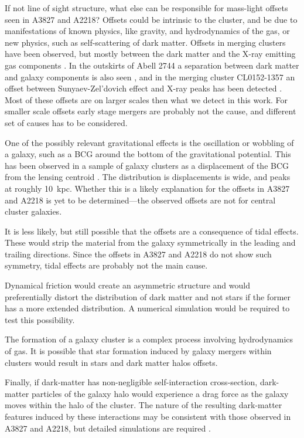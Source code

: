 \documentclass[
  11pt,
  twoside,
  openright,
  titlepage,
  headings=optiontoheadandtoc
]{scrbook}
\begin{document}
If not line of sight structure, what else can be responsible for mass-light offsets seen in 
A3827 and A2218?  Offsets could be intrinsic to the cluster, and be due to manifestations 
of known physics, like gravity, and hydrodynamics of the gas, or new physics, such as self-scattering 
of dark matter. Offsets in merging clusters have been observed, but mostly between the dark matter and 
the X-ray emitting gas components \citep{2006ApJ...648L.109C,2013MNRAS.429..833H,2012ApJ...758..128C}. 
In the outskirts of Abell 2744 a separation between dark matter and galaxy components is also seen
\citep{2011MNRAS.417..333M}, and in the merging cluster CL0152-1357 an offset between Sunyaev-Zel'dovich 
effect and X-ray peaks has been detected \citep{2012ApJ...748...45M}.  Most of these offsets are
on larger scales then what we detect in this work. For smaller scale offsets early stage mergers are
probably not the cause, and different set of causes has to be considered.

One of the possibly relevant gravitational effects is the oscillation or wobbling of a galaxy, 
such as a BCG around the bottom of the gravitational potential. This has been observed in 
a sample of galaxy clusters as a displacement of the BCG from the lensing centroid
\citep{2012MNRAS.426.2944Z}. The distribution is displacements is wide, and peaks at
roughly 10~kpc.  Whether this is a likely explanation for the offsets in A3827 and A2218 is yet 
to be determined---the observed offsets are not for central cluster galaxies.

It is less likely, but still possible that the offsets are a consequence of tidal effects. 
These would strip the material from the galaxy symmetrically in the leading and 
trailing directions. Since the offsets in A3827 and A2218 do not show such symmetry, 
tidal effects are probably not the main cause.

Dynamical friction would create an asymmetric structure and would preferentially 
distort the distribution of dark matter and not stars if the former has a more extended 
distribution. A numerical simulation would be required to test this possibility.

The formation of a galaxy cluster is a complex process involving hydrodynamics of gas. 
It is possible that  star formation induced by galaxy mergers within clusters would result 
in stars and dark matter halos offsets.

Finally, if dark-matter has non-negligible self-interaction cross-section, dark-matter 
particles of the galaxy halo would experience a drag force as the galaxy moves within
the halo of the cluster. The nature of the resulting dark-matter features induced by these 
interactions may be consistent with those observed in A3827 and A2218, but detailed 
simulations are required \citep{2014MNRAS.437.2865K}.
\end{document}

